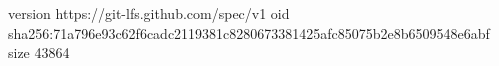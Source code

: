 version https://git-lfs.github.com/spec/v1
oid sha256:71a796e93c62f6cadc2119381c8280673381425afc85075b2e8b6509548e6abf
size 43864
